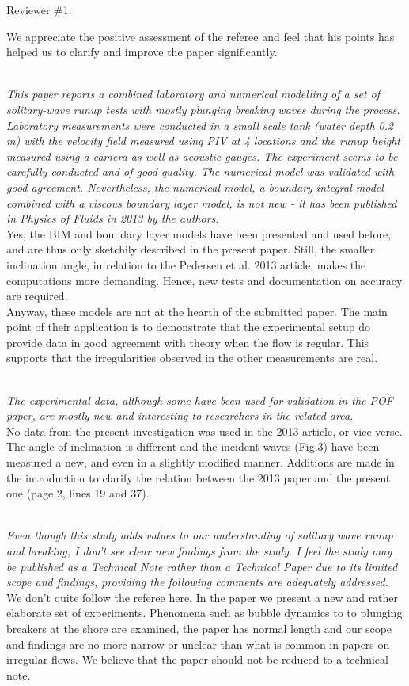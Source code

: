 \documentclass[11pt]{article}
\begin{document}
\newcommand{\refpoint}[1]{\ \vspace{0.3cm}\\ {\em #1}\  \vspace{0.3cm}\\ }
\newcommand{\todo}[1]{\ \\ {\bf To do: #1}}
Reviewer \#1: 

We appreciate the positive assessment of the referee and feel that his points has helped us to clarify and improve the paper significantly.

\refpoint{This paper reports a combined laboratory and numerical modelling of a set of solitary-wave runup tests 
with mostly plunging breaking waves during the process.  Laboratory measurements were conducted in a small scale tank 
(water depth 0.2 m) with the velocity field measured using PIV at 4 locations and the runup height measured using a 
camera as well as acoustic gauges.  The experiment seems to be carefully conducted and of good quality.  The numerical
 model was validated with good agreement.  Nevertheless, the numerical model, a boundary integral model combined with a
 viscous boundary layer model, is not new - it has been published in Physics of Fluids in 2013 by the authors.}
Yes, the BIM and boundary layer models have been presented and used before, and are thus only sketchily described 
in the present paper. Still, the smaller inclination angle, in relation to the Pedersen et al. 2013 article, makes the 
computations more demanding. Hence, new tests and documentation on accuracy are required.\\
Anyway, these models are not at the hearth of the submitted paper.
The main point of their application  is to demonstrate that the experimental setup do
provide data in good agreement with theory when the flow is regular. This supports that the irregularities
observed in the other measurements are real.   

 \refpoint{The 
experimental data, although some have been used for validation in the POF paper, are mostly new and interesting to 
researchers in the related area.}
No data from the present investigation was used in the 2013 article, or vice verse. The angle of inclination
is different and the incident waves (Fig.3) have been measured a new, and even in a slightly modified manner. 
Additions are made in the introduction to clarify the relation between the 2013 paper and the present one (page 2, lines 19 and 37).

\refpoint{ Even though this study adds values to our understanding of solitary wave runup and 
breaking, I don't see clear new findings from the study.
 I feel the study may be published as a Technical Note rather than a Technical Paper due to its limited scope and 
findings, providing the following comments are adequately addressed.}
We don't quite follow the referee here. In the paper we present a new and rather elaborate set of experiments.
Phenomena such as bubble dynamics to to plunging breakers at the shore are examined, 
the paper has normal length and our scope and findings are no more narrow or unclear than what is common in 
papers on irregular flows.
We believe that the paper should not be reduced to a technical note. 
\end{document}
